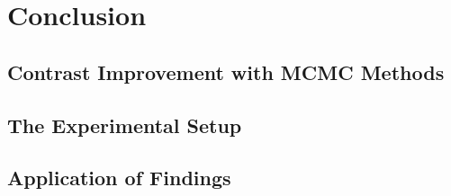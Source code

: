 
\chapter{Conclusion} %
\label{Chapter6}


\section{Contrast Improvement with MCMC Methods}
\section{The Experimental Setup}
\section{Application of Findings}

